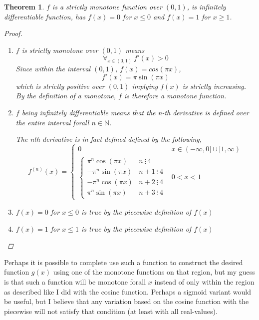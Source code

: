 \documentclass[]{article}
\newcommand{\N}{\mathbb{N}}
\newcommand{\divisible}{ \ \vdots \ }
\newtheorem{theorem}{Theorem}
\begin{document}
\begin{theorem}
    $f$ is a strictly monotone function over $(0,1)$, is infinitely differentiable function, has $f(x) = 0$ for $x \leq 0$ and $f(x) = 1$ for $x \geq 1$.
    \begin{proof}
        \begin{enumerate}
            \item $f$ is strictly monotone over $(0,1)$ means
                \[
                    \forall_{x \in (0,1)} \ f'(x) > 0 
                \]
                Since within the interval $(0,1)$, 
                $f(x) = cos(\pi x)$, 
                \[
                    f'(x) = \pi \sin(\pi x)
                \]
                which is strictly positive over $(0,1)$ implying $f(x)$ is strictly increasing.
                By the definition of a monotone, $f$ is therefore a monotone function.
            \item $f$ being infinitely differentiable means that the n-th derivative is defined over the entire interval forall $n \in \N$.
                
                The nth derivative is in fact defined defined by the following, 
                \[
                    f^{(n)}(x) = \begin{cases}
                        0 & x \in (-\infty, 0] \cup [1,\infty)\\
                        \begin{cases}
                            \pi^n \cos(\pi x) &n \divisible 4\\
                            -\pi^n \sin(\pi x) &n + 1 \divisible 4\\
                            -\pi^n \cos(\pi x) &n + 2 \divisible 4\\
                            \pi^n \sin(\pi x) &n + 3 \divisible 4
                        \end{cases}
                        &0 < x < 1
                    \end{cases}
                \]
            \item $f(x) = 0$ for $x \leq 0$ is true by the piecewise definition of $f(x)$
            \item $f(x) = 1$ for $x \leq 1$ is true by the piecewise definition of $f(x)$
        \end{enumerate}
    \end{proof}
\end{theorem}

Perhaps it is possible to complete use such a function to construct the desired function $g(x)$ using one of the monotone functions on that region, but my guess is that such a function will be monotone forall $x$ instead of only within the region as described like I did with the cosine function.
Perhaps a sigmoid variant would be useful, but I believe that any variation based on the cosine function with the piecewise will not satisfy that condition (at least with all real-values).
\end{document}
